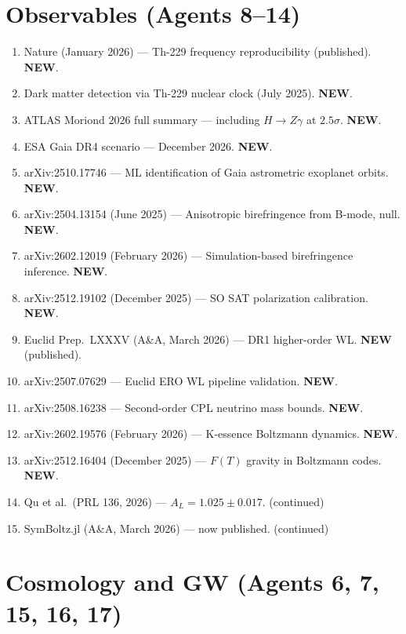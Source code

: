 \documentclass[11pt,a4paper]{article}
\newcommand{\NEW}{\textcolor{dfdblue}{\textbf{NEW}}}
\begin{document}
\section{Observables (Agents 8--14)}

\begin{enumerate}
\item Nature (January 2026) --- Th-229 frequency reproducibility (published). \NEW.
\item Dark matter detection via Th-229 nuclear clock (July 2025). \NEW.
\item ATLAS Moriond 2026 full summary --- including $H \to Z\gamma$ at $2.5\sigma$. \NEW.
\item ESA Gaia DR4 scenario --- December 2026. \NEW.
\item arXiv:2510.17746 --- ML identification of Gaia astrometric exoplanet orbits. \NEW.
\item arXiv:2504.13154 (June 2025) --- Anisotropic birefringence from B-mode, null. \NEW.
\item arXiv:2602.12019 (February 2026) --- Simulation-based birefringence inference. \NEW.
\item arXiv:2512.19102 (December 2025) --- SO SAT polarization calibration. \NEW.
\item Euclid Prep.\ LXXXV (A\&A, March 2026) --- DR1 higher-order WL. \NEW{} (published).
\item arXiv:2507.07629 --- Euclid ERO WL pipeline validation. \NEW.
\item arXiv:2508.16238 --- Second-order CPL neutrino mass bounds. \NEW.
\item arXiv:2602.19576 (February 2026) --- K-essence Boltzmann dynamics. \NEW.
\item arXiv:2512.16404 (December 2025) --- $F(T)$ gravity in Boltzmann codes. \NEW.
\item Qu et al.\ (PRL 136, 2026) --- $A_L = 1.025 \pm 0.017$. (continued)
\item SymBoltz.jl (A\&A, March 2026) --- now published. (continued)
\end{enumerate}

\section{Cosmology and GW (Agents 6, 7, 15, 16, 17)}
\end{document}

